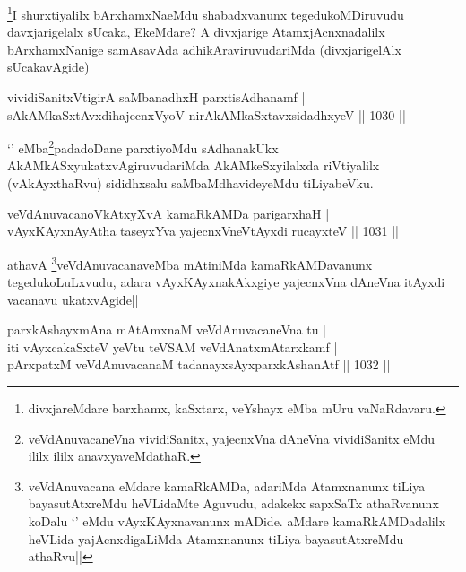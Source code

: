 \begin{artha}
\footnote{divxjareMdare barxhamx, kaSxtarx, veYshayx eMba mUru vaNaRdavaru.}I shurxtiyalilx bArxhamxNaeMdu shabadxvanunx tegedukoMDiruvudu davxjarigelalx sUcaka, EkeMdare? A divxjarige AtamxjAcnxnadalilx bArxhamxNanige samAsavAda adhikAraviruvudariMda (divxjarigelAlx sUcakavAgide)
\end{artha}


\begin{shl}
vividiSanitxVtigirA saMbanadhxH parxtisAdhanamf |\\
sAkAMkaSxtAvxdihajecnxVyoV nirAkAMkaSxtavxsidadhxyeV || 1030 ||
\end{shl}

\begin{artha}
`\stext' eMba\footnote{veVdAnuvacaneVna vividiSanitx, yajecnxVna dAneVna vividiSanitx \stext eMdu ililx ililx anavxyaveMdathaR.}padadoDane parxtiyoMdu sAdhanakUkx AkAMkASxyukatxvAgiruvudariMda AkAMkeSxyilalxda riVtiyalilx (vAkAyxthaRvu) sididhxsalu saMbaMdhavideyeMdu tiLiyabeVku.
\end{artha}


\begin{shl}
veVdAnuvacanoVkAtxyXvA kamaRkAMDa parigarxhaH |\\
vAyxKAyxnAyAtha taseyxYva yajecnxVneVtAyxdi rucayxteV || 1031 ||
\end{shl}

\begin{artha}
athavA \footnote{veVdAnuvacana eMdare kamaRkAMDa, adariMda Atamxnanunx tiLiya bayasutAtxreMdu heVLidaMte Aguvudu, adakekx sapxSaTx athaRvanunx koDalu `\stext' eMdu vAyxKAyxnavanunx mADide. aMdare kamaRkAMDadalilx heVLida yajAcnxdigaLiMda Atamxnanunx tiLiya bayasutAtxreMdu athaRvu||}veVdAnuvacanaveMba mAtiniMda kamaRkAMDavanunx tegedukoLuLxvudu, adara vAyxKAyxnakAkxgiye yajecnxVna dAneVna itAyxdi vacanavu ukatxvAgide||
\end{artha}


\begin{shl}
parxkAshayxmAna mAtAmxnaM veVdAnuvacaneVna tu |\\
iti vAyxcakaSxteV yeVtu teVSAM veVdAnatxmAtarxkamf |\\
pArxpatxM veVdAnuvacanaM tadanayxsAyxparxkAshanAtf || 1032 ||
\end{shl}

